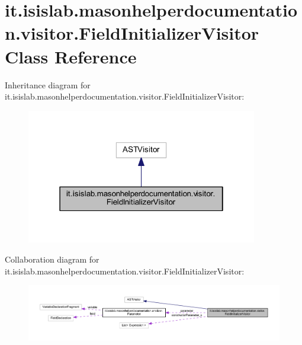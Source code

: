 \hypertarget{classit_1_1isislab_1_1masonhelperdocumentation_1_1visitor_1_1_field_initializer_visitor}{\section{it.\-isislab.\-masonhelperdocumentation.\-visitor.\-Field\-Initializer\-Visitor Class Reference}
\label{classit_1_1isislab_1_1masonhelperdocumentation_1_1visitor_1_1_field_initializer_visitor}
}


Inheritance diagram for it.\-isislab.\-masonhelperdocumentation.\-visitor.\-Field\-Initializer\-Visitor\-:\nopagebreak
\begin{figure}[H]
\begin{center}
\leavevmode
\includegraphics[width=286pt]{classit_1_1isislab_1_1masonhelperdocumentation_1_1visitor_1_1_field_initializer_visitor__inherit__graph}
\end{center}
\end{figure}


Collaboration diagram for it.\-isislab.\-masonhelperdocumentation.\-visitor.\-Field\-Initializer\-Visitor\-:\nopagebreak
\begin{figure}[H]
\begin{center}
\leavevmode
\includegraphics[width=350pt]{classit_1_1isislab_1_1masonhelperdocumentation_1_1visitor_1_1_field_initializer_visitor__coll__graph}
\end{center}
\end{figure}
